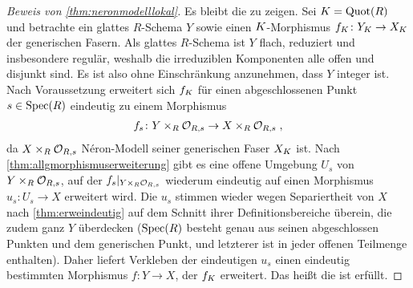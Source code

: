 \begin{proof}[Beweis von \ref{thm:neronmodelllokal}]
  Es bleibt die \NAbbEig zu zeigen.
  Sei ${K=\operatorname{Quot}(R)}$ und betrachte ein glattes $R$-Schema $Y$ sowie
  einen $K$-Morphismus ${f_{K}\colon Y_{K}\to X_{K}}$ der
  generischen Fasern.
  Als glattes $R$-Schema ist $Y$ flach, reduziert und insbesondere
  regulär, weshalb die irreduziblen Komponenten alle offen und
  disjunkt sind. Es ist also ohne Einschränkung anzunehmen, dass
  $Y$ integer ist.
  Nach Voraussetzung erweitert sich $f_{K}$ für einen abgeschlossenen
  Punkt $s\in\operatorname{Spec}(R)$ eindeutig zu einem Morphismus
  \begin{gather*}
    f_s\colon Y\times_R\mathcal{O}_{R,s}\to X\times_R\mathcal{O}_{R,s}\;,
  \end{gather*}
  da $X\times_R\mathcal{O}_{R,s}$ Néron-Modell seiner generischen Faser $X_{K}$
  ist.
  Nach \ref{thm:allgmorphismuserweiterung} gibt es eine offene
  Umgebung $U_s$ von $Y\times_R\mathcal{O}_{R,s}$, auf der
  $f_s|_{Y\times_R\mathcal{O}_{R,s}}$ wiederum
  eindeutig auf einen Morphismus $u_s\colon U_s\to X$ erweitert
  wird.
  Die $u_s$ stimmen wieder wegen Separiertheit von $X$
  nach \ref{thm:erweindeutig} auf dem Schnitt ihrer
  Definitionsbereiche überein, die zudem ganz $Y$ überdecken
  ($\operatorname{Spec}(R)$ besteht genau aus seinen
  abgeschlossen Punkten und dem generischen Punkt, und letzterer ist
  in jeder offenen Teilmenge enthalten).
  Daher liefert Verkleben der eindeutigen $u_s$ einen
  eindeutig bestimmten Morphismus $f\colon Y\to X$, der
  $f_{K}$ erweitert.
  Das heißt die \NAbbEig ist erfüllt.
\end{proof}


